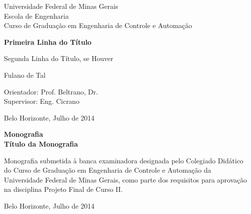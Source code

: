 \begin{titlepage}
\begin{center}
{\large Universidade Federal de Minas Gerais\\
Escola de Engenharia \\
Curso de Graduação em Engenharia de Controle e Automação\\}

\vspace{6cm}
{\bf\Large Primeira Linha do Título\vspace{0.2cm}

Segunda Linha do Título, se Houver}
\vspace{4cm}

{\large Fulano de Tal}
\vspace{2cm}  
   
\vspace{2cm}          
{\large Orientador: Prof. Beltrano, Dr.}\\
{\large Supervisor: Eng. Cicrano}

\vfill
{\large Belo Horizonte, Julho de 2014 }
\end{center}

\end{titlepage}

\newpage
\clearpage
\thispagestyle{empty}


\begin{titlepage}

\centering
\textbf{Monografia}\\
\vspace{2cm}
\centering
\textbf{Título da Monografia}\\
\vspace{5cm} 

\parbox{1.0\textwidth} 
{\large 
Monografia submetida à banca examinadora
designada pelo Colegiado Didático do Curso de
Graduação em Engenharia de Controle e
Automação da Universidade Federal de Minas
Gerais, como parte dos requisitos para aprovação na
disciplina Projeto Final de Curso II.}

\vspace{7cm} 
\centering
Belo Horizonte, Julho de 2014

\end{titlepage}
